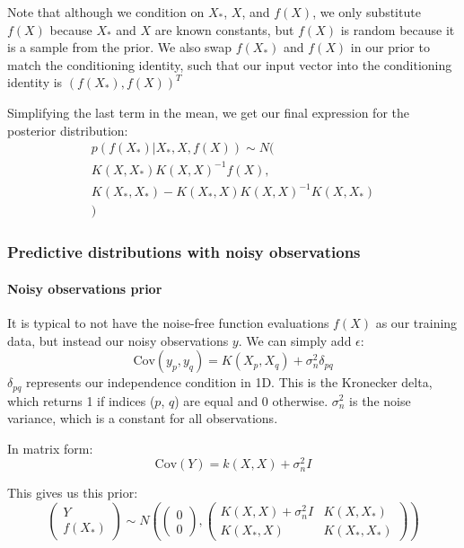 \documentclass[10pt]{article}
\begin{document}
Note that although we condition on $X_*$, $X$, and $f(X)$, we only substitute $f(X)$ because $X_*$ and $X$ are known constants, but $f(X)$ is random because it is a sample from the prior. We also swap $f(X_*)$ and $f(X)$ in our prior to match the conditioning identity, such that our input vector into the conditioning identity is $(f(X_*), f(X))^T$
    
Simplifying the last term in the mean, we get our final expression for the posterior distribution:
\begin{equation*}
    \begin{aligned}
        p(f(X_*)|X_*, X, f(X)) \sim N( \\
        K(X,X_*)K(X,X)^{-1}f(X), \\
        K(X_*,X_*) - K(X_*,X)K(X,X)^{-1}K(X,X_*) \\
        )
    \end{aligned}
\end{equation*}


\subsubsection{Predictive distributions with noisy observations}
\paragraph{Noisy observations prior}
It is typical to not have the noise-free function evaluations $f(X)$ as our training data, but instead our noisy observations $y$. We can simply add $\epsilon$:
\begin{equation*}
    \text{Cov}(y_p, y_q) = K(X_p, X_q) + \sigma^2_n\delta_{pq}
\end{equation*}
$\delta_{pq}$ represents our independence condition in 1D. This is the Kronecker delta, which returns 1 if indices ($p$, $q$) are equal and 0 otherwise. $\sigma^2_n$ is the noise variance, which is a constant for all observations.
    
In matrix form:
\begin{equation*}
    \text{Cov}(Y) = k(X,X) + \sigma^2_nI
\end{equation*}
    
This gives us this prior:
\begin{equation*}
    \begin{pmatrix}
        Y \\ f(X_*)
    \end{pmatrix} \sim N\left(
    \begin{pmatrix}
        0 \\ 0
    \end{pmatrix},
    \begin{pmatrix}
        K(X,X) + \sigma^2_nI & K(X,X_*) \\ K(X_*,X) & K(X_*,X_*)
    \end{pmatrix}
    \right)
\end{equation*}
\end{document}

